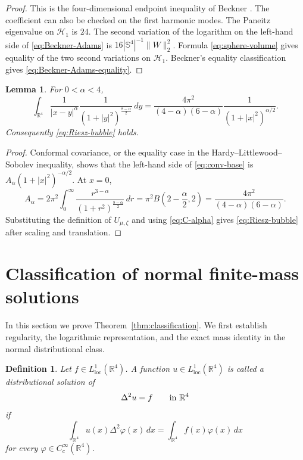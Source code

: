 \documentclass[11pt]{article}
\newtheorem{lemma}[theorem]{Lemma}
\newtheorem{definition}[theorem]{Definition}
\numberwithin{equation}{section}
\begin{document}
\begin{proof}
This is the four-dimensional endpoint inequality of Beckner \cite{Beckner}. The coefficient can also be checked on the first harmonic modes. The Paneitz eigenvalue on \(\mathcal H_{1}\) is \(24\). The second variation of the logarithm on the left-hand side of \eqref{eq:Beckner-Adams} is \(16|\mathbb S^{4}|^{-1}\|W\|_{2}^{2}\). Formula \eqref{eq:sphere-volume} gives equality of the two second variations on \(\mathcal H_{1}\). Beckner's equality classification gives \eqref{eq:Beckner-Adams-equality}.
\end{proof}

\begin{lemma}\label{lem:convolution-identity}
For \(0<\alpha<4\),
\begin{equation}\label{eq:conv-base}
\int_{\mathbb R^{4}}
\frac{1}{|x-y|^{\alpha}}
\frac{1}{(1+|y|^{2})^{\frac{8-\alpha}{2}}}\,dy
=
\frac{4\pi^{2}}{(4-\alpha)(6-\alpha)}
\frac{1}{(1+|x|^{2})^{\alpha/2}}.
\end{equation}
Consequently \eqref{eq:Riesz-bubble} holds.
\end{lemma}

\begin{proof}
Conformal covariance, or the equality case in the Hardy--Littlewood--Sobolev inequality, shows that the left-hand side of \eqref{eq:conv-base} is \(A_{\alpha}(1+|x|^{2})^{-\alpha/2}\). At \(x=0\),
\[
A_{\alpha}=2\pi^{2}\int_{0}^{\infty}
\frac{r^{3-\alpha}}{(1+r^{2})^{\frac{8-\alpha}{2}}}\,dr
=\pi^{2}B\left(2-\frac{\alpha}{2},2\right)
=\frac{4\pi^{2}}{(4-\alpha)(6-\alpha)}.
\]
Substituting the definition of \(U_{\mu,\zeta}\) and using \eqref{eq:C-alpha} gives \eqref{eq:Riesz-bubble} after scaling and translation.
\end{proof}

\section{Classification of normal finite-mass solutions}

In this section we prove Theorem~\ref{thm:classification}. We first establish regularity, the logarithmic representation, and the exact mass identity in the normal distributional class.  

\begin{definition}
Let \(f\in L^{1}_{\operatorname{loc}}(\mathbb R^{4})\). A function \(u\in L^{1}_{\operatorname{loc}}(\mathbb R^{4})\) is called a distributional solution of
\[
\Delta^{2}u=f
\qquad\hbox{in }\mathbb R^{4}
\]
if
\[
\int_{\mathbb R^{4}}u(x)\Delta^{2}\varphi(x)\,dx
=
\int_{\mathbb R^{4}}f(x)\varphi(x)\,dx
\]
for every \(\varphi\in C_{c}^{\infty}(\mathbb R^{4})\).
\end{definition}
\end{document}
